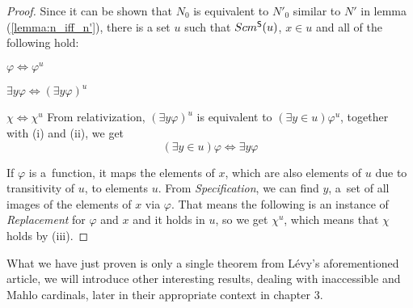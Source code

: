 \begin{proof}
Since it can be shown that $N_0$ is equivalent to $N'_0$ similar to $N'$ in lemma (\ref{lemma:n_iff_n'}), 
there is a set $u$ such that $Scm^{\sf{S}}(u)$, $x \in u$ and all of the following hold:
\bce[(i)]
\item $\varphi \iff \varphi^{u}$
\item $\exists y \varphi \iff (\exists y \varphi)^{u}$
\item $\chi \iff \chi^{u}$
\ece
From relativization, $(\exists y \varphi)^{u}$ is equivalent to $(\exists y \in u) \varphi^{u}$, together with (i) and (ii), we get
\begin{equation}
(\exists y \in u)\varphi \iff \exists y \varphi
\end{equation}

If $\varphi$ is a~function, %
it maps the elements of $x$, which are also elements of $u$ due to transitivity of $u$, to elements $u$. From \emph{Specification}, we can find $y$, a~set of all images of the elements of $x$ via $\varphi$. That means the following is an instance of \emph{Replacement} for $\varphi$ and $x$ and it holds in $u$, so we get $\chi^{u}$, which means that $\chi$ holds by (iii).
\end{proof} %

What we have just proven is only a single theorem from Lévy's aforementioned article, we will introduce other interesting results, dealing with inaccessible and Mahlo cardinals, later in their appropriate context in chapter 3. %

